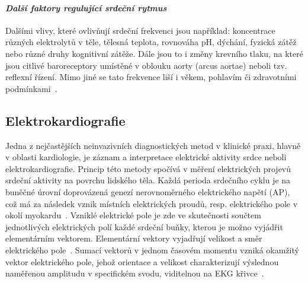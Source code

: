 \paragraph*{\textit{Další faktory regulující srdeční rytmus}\\} Dalšími vlivy,
které ovlivňují srdeční frekvenci jsou například: koncentrace různých
elektrolytů v těle, tělesná teplota, rovnováha pH, dýchání, fyzická zátěž nebo
různé druhy kognitivní zátěže. Dále jsou to i změny krevního tlaku, na které
jsou citlivé baroreceptory umístěné v oblouku aorty (arcus aortae) neboli tzv.
reflexní řízení. Mimo jiné se tato frekvence liší i věkem, pohlavím či
zdravotními podmínkami~\cite{Kittnar2020}.

\subsection{Elektrokardiografie}
\label{section:electrocardiography}
Jedna z nejčastějších neinvazivních diagnostických metod v klinické praxi,
hlavně v oblasti kardiologie, je záznam a interpretace elektrické aktivity srdce
neboli elektrokardiografie. Princip této metody spočívá v měření elektrických
projevů srdeční aktivity na povrchu lidského těla. Každá perioda srdečního cyklu
je na buněčné úrovní doprovázená genezí nerovnoměrného elektrického napětí (AP),
což má za následek vznik místních elektrických proudů, resp. elektrického pole v
okolí myokardu~\cite{Kittnar2020}. Vzniklé elektrické pole je zde ve skutečnosti
součtem jednotlivých elektrických polí každé srdeční buňky, kterou je možno
vyjádřit elementárním vektorem. Elementární vektory vyjadřují velikost a směr
elektrického pole~\cite{Stejfa2006}. Sumací vektorů v jednom časovém momentu
vzniká okamžitý vektor elektrického pole, jehož orientace a velikost
charakterizují výslednou naměřenou amplitudu v specifickém svodu, viditelnou na
EKG křivce~\cite{Surawicz2008,Kittnar2020}.

